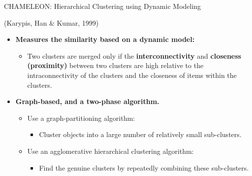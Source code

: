 \begin{frame}{CHAMELEON: Hierarchical Clustering using Dynamic Modeling}

	(Karypis, Han \& Kumar, 1999)
	\begin{itemize}
		\item \textbf{Measures the similarity based on a dynamic model:}
		      \begin{itemize}
			      \item Two clusters are merged only if the
			            \textbf{interconnectivity} and \textbf{closeness (proximity)}
			            between two clusters are high relative to the intraconnectivity
			            of the clusters and the closeness of items within the clusters.
		      \end{itemize}
		\item \textbf{Graph-based, and a two-phase algorithm.}
		      \begin{itemize}
			      \item Use a graph-partitioning algorithm:
			            \begin{itemize}
				            \item Cluster objects into a large number of relatively
				                  small sub-clusters.
			            \end{itemize}
			      \item Use an agglomerative hierarchical clustering algorithm:
			            \begin{itemize}
				            \item Find the genuine clusters by repeatedly combining
				                  these sub-clusters.
			            \end{itemize}
		      \end{itemize}
	\end{itemize}

\end{frame}

